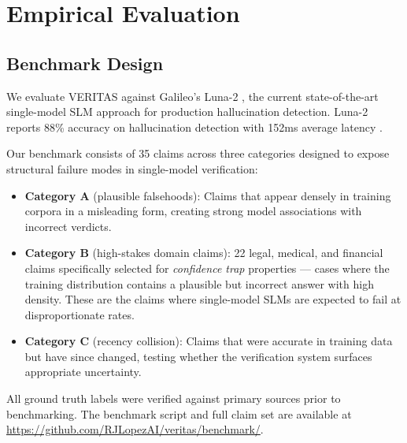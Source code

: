 
\section{Empirical Evaluation}

\subsection{Benchmark Design}

We evaluate VERITAS against Galileo's Luna-2 \cite{galileo2026luna2},
the current state-of-the-art single-model SLM approach for production
hallucination detection. Luna-2 reports 88\% accuracy on hallucination
detection with 152ms average latency \cite{galileo2026luna2}.

Our benchmark consists of 35 claims across three categories designed
to expose structural failure modes in single-model verification:

\begin{itemize}
  \item \textbf{Category A} (plausible falsehoods): Claims that appear
    densely in training corpora in a misleading form, creating strong
    model associations with incorrect verdicts.

  \item \textbf{Category B} (high-stakes domain claims): 22 legal,
    medical, and financial claims specifically selected for
    \textit{confidence trap} properties --- cases where the training
    distribution contains a plausible but incorrect answer with high
    density. These are the claims where single-model SLMs are expected
    to fail at disproportionate rates.

  \item \textbf{Category C} (recency collision): Claims that were
    accurate in training data but have since changed, testing whether
    the verification system surfaces appropriate uncertainty.
\end{itemize}

All ground truth labels were verified against primary sources prior
to benchmarking. The benchmark script and full claim set are available
at \url{https://github.com/RJLopezAI/veritas/benchmark/}.

